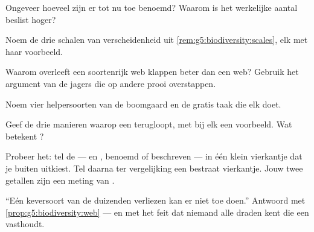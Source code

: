 \begin{exercise}[$\star$]\label{exo:g5:biodiversity:3}
Ongeveer hoeveel  zijn er tot nu toe benoemd? Waarom is het
werkelijke aantal beslist hoger?
\end{exercise}

\begin{exercise}[$\star$]\label{exo:g5:biodiversity:4}
Noem de drie schalen van verscheidenheid uit
\cref{rem:g5:biodiversity:scales}, elk met haar voorbeeld.
\end{exercise}

\begin{exercise}[$\star$]\label{exo:g5:biodiversity:5}
Waarom overleeft een soortenrijk web klappen beter dan een  web?
Gebruik het argument van de jagers die op andere prooi overstappen.
\end{exercise}

\begin{exercise}[$\star$]\label{exo:g5:biodiversity:6}
Noem vier helpersoorten van de boomgaard en de gratis taak die elk doet.
\end{exercise}

\begin{exercise}[$\star$]\label{exo:g5:biodiversity:7}
Geef de drie manieren waarop een  terugloopt, met bij elk een
voorbeeld. Wat betekent \emph{}?
\end{exercise}

\begin{exercise}[$\star$]\label{exo:g5:biodiversity:8}
Probeer het: tel de  ---  en , benoemd of beschreven
--- in één klein vierkantje dat je buiten uitkiest. Tel daarna ter
vergelijking een bestraat vierkantje. Jouw twee getallen zijn een meting
van .
\end{exercise}

\begin{exercise}[$\star\star$]\label{exo:g5:biodiversity:9}
``Eén keversoort van de duizenden verliezen kan er niet toe doen.''
Antwoord met \cref{prop:g5:biodiversity:web} --- en met het feit dat
niemand alle draden kent die een  vasthoudt.
\end{exercise}

